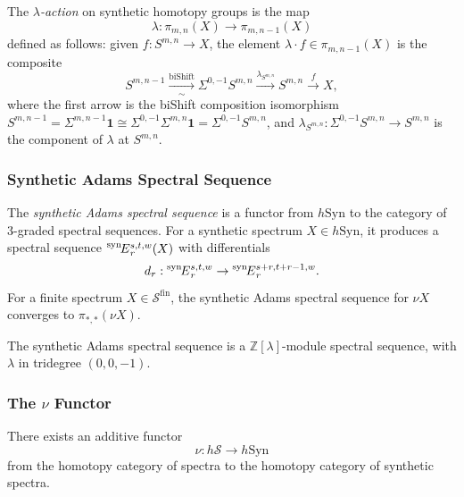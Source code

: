 \begin{definition}\label{prereq:def:lambda-action}
    \leanok
    The \emph{$\lambda$-action} on synthetic homotopy groups is the map
    $$\lambda: \pi_{m,n}(X) \to \pi_{m,n-1}(X)$$
    defined as follows: given $f: S^{m,n} \to X$, the element $\lambda \cdot f \in \pi_{m,n-1}(X)$ is the composite
    $$S^{m,n-1} \xrightarrow[\sim]{\mathrm{biShift}} \Sigma^{0,-1}S^{m,n} \xrightarrow{\lambda_{S^{m,n}}} S^{m,n} \xrightarrow{f} X,$$
    where the first arrow is the biShift composition isomorphism $S^{m,n-1} = \Sigma^{m,n-1}\mathbf{1} \cong \Sigma^{0,-1}\Sigma^{m,n}\mathbf{1} = \Sigma^{0,-1}S^{m,n}$, and $\lambda_{S^{m,n}}: \Sigma^{0,-1}S^{m,n} \to S^{m,n}$ is the component of $\lambda$ at $S^{m,n}$.
\end{definition}

\subsubsection{Synthetic Adams Spectral Sequence}\label{sec:prereq-syn-adams}

\begin{axiom}\label{prereq:ax:syn-adams-ss}
    \leanok
    The \emph{synthetic Adams spectral sequence} is a functor from $h\mathrm{Syn}$ to the category of 3-graded spectral sequences. For a synthetic spectrum $X \in h\mathrm{Syn}$, it produces a spectral sequence $\prescript{\mathrm{syn}\!}{}{E}_r^{s,t,w}(X)$ with differentials
    $$d_r: \prescript{\mathrm{syn}\!}{}{E}_r^{s,t,w} \to \prescript{\mathrm{syn}\!}{}{E}_r^{s+r, t+r-1, w}.$$
    For a finite spectrum $X \in \mathcal{S}^{\mathrm{fin}}$, the synthetic Adams spectral sequence for $\nu X$ converges to $\pi_{*,*}(\nu X)$.
\end{axiom}

\begin{remark}
    The synthetic Adams spectral sequence is a $\mathbb{Z}[\lambda]$-module spectral sequence, with $\lambda$ in tridegree $(0,0,-1)$.
\end{remark}

\subsubsection{The $\nu$ Functor}\label{sec:prereq-nu}

\begin{definition}\label{prereq:def:nu-functor}
    \leanok
    There exists an additive functor
    $$\nu: h\mathcal{S} \to h\mathrm{Syn}$$
    from the homotopy category of spectra to the homotopy category of synthetic spectra.
\end{definition}

